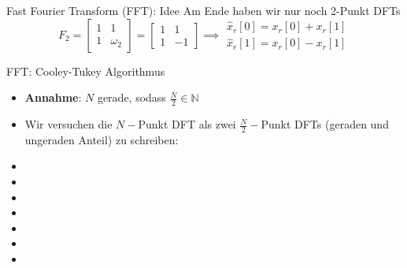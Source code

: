 \documentclass[14pt, aspectratio=169, handout]{beamer}
\begin{document}
\begin{frame}{Fast Fourier Transform (FFT): Idee}
    Am Ende haben wir nur noch 2-Punkt DFTs
    $$F_2 = \begin{bmatrix}
    1 & 1 \\
    1 & \omega_2
\end{bmatrix} = \begin{bmatrix}
    1 & 1 \\
    1 & -1
\end{bmatrix} \implies \begin{array}{l}
    \hat{x}_r[0] = x_r[0] + x_r[1] \\
    \hat{x}_r[1] = x_r[0] - x_r[1]
\end{array}$$

\end{frame}

\begin{frame}{FFT: Cooley-Tukey Algorithmus}
    \begin{itemize}
        \item \textbf{Annahme}: $N$ gerade, sodass $\frac{N}{2} \in \mathbb{N}$
        \item Wir versuchen die $N-$Punkt DFT als zwei $\frac{N}{2}-$Punkt DFTs (geraden und ungeraden Anteil) zu schreiben:
        \item[]
        \item[]
        \item[]
        \item[]
        \item[]
        \item[]
        \item[]
    \end{itemize}
\end{frame}
\end{document}
